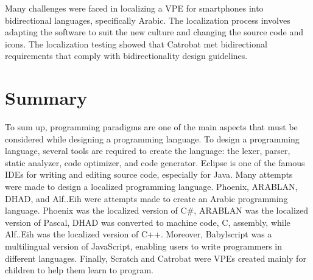 Many challenges were faced in localizing a VPE for smartphones into bidirectional languages, specifically Arabic. The localization process involves adapting the software to suit the new culture and changing the source code and icons. The localization testing showed that Catrobat met bidirectional requirements that comply with bidirectionality design guidelines. 
\section{Summary}
To sum up, programming paradigms are one of the main aspects that must be considered while designing a programming language. To design a programming language, several tools are required to create the language: the lexer, parser, static analyzer, code optimizer, and code generator. Eclipse is one of the famous IDEs for writing and editing source code, especially for Java. Many attempts were made to design a localized programming language. Phoenix, ARABLAN, DHAD, and Alf..Eih were attempts made to create an Arabic programming language. Phoenix was the localized version of C\#, ARABLAN was the localized version of Pascal, DHAD was converted to machine code, C, assembly, while Alf..Eih was the localized version of C++. Moreover, Babylscript was a multilingual version of JavaScript, enabling users to write programmers in different languages. Finally, Scratch and Catrobat were VPEs created mainly for children to help them learn to program. 
